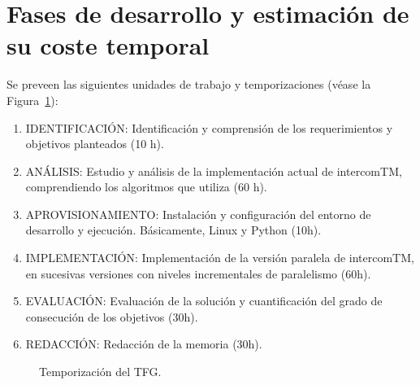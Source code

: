 \documentclass[titlepage, 12pt, a4paper, oneside]{article}
\begin{document}
\section{Fases de desarrollo y estimación de su coste temporal}
\label{sec:fases}
Se preveen las siguientes unidades de trabajo y temporizaciones (véase
la Figura~\ref{fig:temporizacion}):
\begin{enumerate}
  \item {IDENTIFICACIÓN}: Identificación y comprensión de los
    requerimientos y objetivos planteados (10 h).
  \item {ANÁLISIS:} Estudio y análisis de la implementación actual de
    intercomTM, comprendiendo los algoritmos que utiliza (60 h).
  \item {APROVISIONAMIENTO}: Instalación y configuración del entorno
    de desarrollo y ejecución. Básicamente, Linux y Python (10h).
  \item {IMPLEMENTACIÓN}: Implementación de la versión paralela de
    intercomTM, en sucesivas versiones con niveles incrementales de
    paralelismo (60h).
  \item {EVALUACIÓN}: Evaluación de la solución y cuantificación del
    grado de consecución de los objetivos (30h).
  \item {REDACCIÓN}: Redacción de la memoria (30h).
\end{enumerate}

\begin{figure}
  \begin{center}
  \end{center}
  \caption{Temporización del TFG.\label{fig:temporizacion}}
\end{figure}
\end{document}
